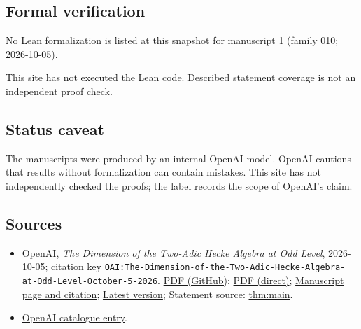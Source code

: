 \documentclass[11pt]{article}
\begin{document}
\subsection{Formal verification}
No Lean formalization is listed at this snapshot for manuscript 1 (family 010; 2026-10-05).

This site has not executed the Lean code. Described statement coverage is not an independent proof check.

\subsection{Status caveat}
The manuscripts were produced by an internal OpenAI model. OpenAI cautions that results without formalization can contain mistakes. This site has not independently checked the proofs; the label records the scope of OpenAI's claim.

\subsection{Sources}
\begin{itemize}
\item OpenAI, \emph{The Dimension of the Two-Adic Hecke Algebra at Odd Level}, 2026-10-05; citation key \texttt{OAI:The-Dimension-of-the-Two-Adic-Hecke-Algebra-at-Odd-Level-October-5-2026}. \href{https://github.com/openai/math/blob/adc7f1241b42e322a6451854ab7e4b4c146bf78a/preprints/The-Dimension-of-the-Two-Adic-Hecke-Algebra-at-Odd-Level-October-5-2026/two-adic-hecke.pdf}{PDF (GitHub)}; \href{https://github.com/openai/math/raw/adc7f1241b42e322a6451854ab7e4b4c146bf78a/preprints/The-Dimension-of-the-Two-Adic-Hecke-Algebra-at-Odd-Level-October-5-2026/two-adic-hecke.pdf}{PDF (direct)}; \href{https://github.com/openai/math/blob/adc7f1241b42e322a6451854ab7e4b4c146bf78a/preprints/The-Dimension-of-the-Two-Adic-Hecke-Algebra-at-Odd-Level-October-5-2026/README.md}{Manuscript page and citation}; \href{https://github.com/openai/math/blob/main/preprints/The-Dimension-of-the-Two-Adic-Hecke-Algebra-at-Odd-Level-October-5-2026/two-adic-hecke.pdf}{Latest version}; Statement source: \href{https://github.com/openai/math/blob/adc7f1241b42e322a6451854ab7e4b4c146bf78a/preprints/The-Dimension-of-the-Two-Adic-Hecke-Algebra-at-Odd-Level-October-5-2026/build/main.tex\#L88}{thm:main}.
\item \href{https://github.com/openai/math/blob/adc7f1241b42e322a6451854ab7e4b4c146bf78a/CONTENTS.md}{OpenAI catalogue entry}.
\end{itemize}
\end{document}
